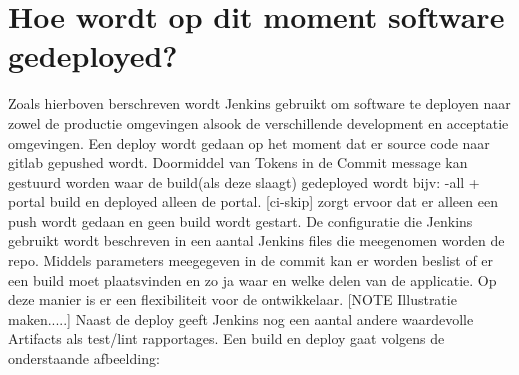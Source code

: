 \section{Hoe wordt op dit moment software gedeployed?}\label{sec:hoe-wordt-op-dit-moment-software-gedeployed?}
Zoals hierboven berschreven wordt Jenkins gebruikt om software te deployen naar zowel de productie omgevingen alsook de verschillende development en acceptatie omgevingen.
Een deploy wordt gedaan op het moment dat er source code naar gitlab gepushed wordt.
Doormiddel van Tokens in de Commit message kan gestuurd worden waar de build(als deze slaagt) gedeployed wordt bijv: {-all + portal} build en deployed alleen de portal. [ci-skip] zorgt ervoor dat er alleen een push wordt gedaan en geen build wordt gestart.
De configuratie die Jenkins gebruikt wordt beschreven in een aantal Jenkins files die meegenomen worden de repo. Middels parameters meegegeven in de commit kan er worden beslist of er een build moet plaatsvinden en zo ja waar en welke delen van de applicatie. Op deze manier is er een flexibiliteit voor de ontwikkelaar.
[NOTE Illustratie maken.....]
Naast de deploy geeft Jenkins nog een aantal andere waardevolle Artifacts als test/lint rapportages.
Een build en deploy gaat volgens de onderstaande afbeelding:

